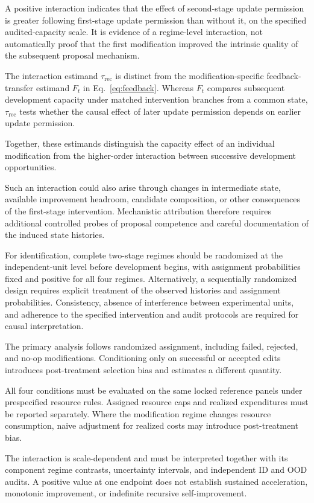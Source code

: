 \documentclass[11pt,a4paper]{article}
\begin{document}
A positive interaction indicates that the effect of second-stage update permission is greater following first-stage update permission than without it, on the specified audited-capacity scale. It is evidence of a regime-level interaction, not automatically proof that the first modification improved
the intrinsic quality of the subsequent proposal mechanism.

The interaction estimand $\tau_{\mathrm{rec}}$ is distinct from the modification-specific feedback-transfer estimand $F_t$ in Eq.~\eqref{eq:feedback}. Whereas $F_t$ compares subsequent development
capacity under matched intervention branches from a common state, $\tau_{\mathrm{rec}}$
tests whether the causal effect of later update permission depends on earlier update permission.

Together, these estimands distinguish the capacity effect of an individual modification from the higher-order interaction between successive development opportunities.

Such an interaction could also arise through changes in intermediate state, available improvement headroom, candidate composition, or other consequences of the first-stage intervention. Mechanistic attribution therefore requires additional controlled probes of proposal competence and careful documentation of the induced state histories.

For identification, complete two-stage regimes should be randomized at the independent-unit level before development begins, with assignment probabilities fixed and positive for all four regimes. Alternatively, a sequentially randomized design requires explicit treatment of the observed histories and assignment probabilities. Consistency, absence of interference between experimental units, and adherence to the specified intervention and audit protocols are required for causal interpretation.

The primary analysis follows randomized assignment, including failed, rejected, and no-op modifications. Conditioning only on successful or accepted edits introduces post-treatment selection bias and estimates a different quantity.

All four conditions must be evaluated on the same locked reference panels under prespecified resource rules. Assigned resource caps and realized expenditures must be reported separately. Where the
modification regime changes resource consumption, naive adjustment for realized costs may introduce post-treatment bias.

The interaction is scale-dependent and must be interpreted together with its component regime contrasts, uncertainty intervals, and independent ID and OOD audits. A positive value at one endpoint
does not establish sustained acceleration, monotonic improvement, or indefinite recursive self-improvement.
\end{document}

